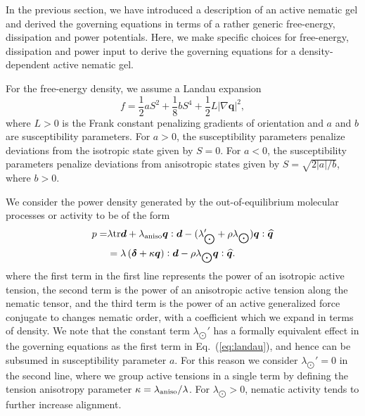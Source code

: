 In the previous section, we have introduced a description of an active nematic gel and derived the governing equations in terms of a rather generic free-energy,  dissipation and power potentials. Here, we make specific choices for free-energy, dissipation and power input to derive the governing equations for a density-dependent active nematic gel. 

For the free-energy density, we assume a Landau expansion
\begin{equation} 
	\label{eq:landau}
	f = \frac{1}{2}a S^2 + \frac{1}{8}b S^4 + \frac{1}{2} L \left|\nabla \bm{q}\right|^2,
\end{equation}
where $L>0$ is the Frank constant penalizing gradients of orientation and $a$ and $b$ are susceptibility parameters. For $a>0$, the susceptibility parameters penalize deviations from the isotropic state given by $S=0$. For $a<0$, the susceptibility parameters penalize deviations from anisotropic states given by $S= \sqrt{2|a|/b}$, where $b>0$. 

We consider the power density generated by the out-of-equilibrium molecular processes or activity to be of the form
\begin{align} \label{eq:pow_density_example}
	p= &  \lambda \textup{tr}\bm{d} + \lambda_{\rm aniso} \bm{q}:\bm{d}  \nonumber   -(\lambda_{\bigodot}' + \rho \lambda_{\bigodot})  \bm{q} : \widehat{\bm{q}} \\ &  =  \lambda \left(\bm{\delta} + \kappa \bm{q}\right) : \bm{d} - \rho \lambda_{\bigodot}  \bm{q} : \widehat{\bm{q}}.
\end{align}
where the first term in the first line represents the power of an isotropic active tension, the second term is the power of an anisotropic active tension along the  nematic tensor, and the third term is the power of an active generalized force conjugate to changes nematic order, with a coefficient which we expand in terms of density. We note that the constant term $\lambda_{\bigodot}'$ has a formally equivalent effect in the governing equations as the first term in Eq.~(\ref{eq:landau}), and hence can be subsumed in susceptibility parameter $a$.  For this reason we consider $\lambda_{\bigodot}'= 0$ in the second line, where  we group active tensions in a single term by defining the tension anisotropy parameter $\kappa=\lambda_{\rm aniso}/\lambda$. For $\lambda_{\bigodot}>0$, nematic activity tends to further increase alignment.

